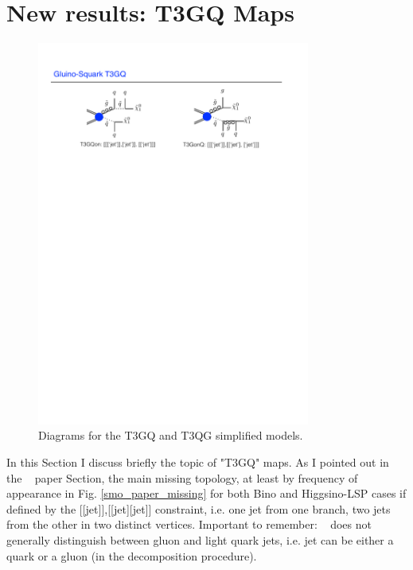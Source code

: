 \documentclass[a4paper,11pt]{article}
\begin{document}
\section{New results: T3GQ Maps}
\begin{figure}[!]
	\begin{center}
		\includegraphics[width=0.8\textwidth]{Fig/TGQ/TGQ.pdf}
	\end{center}
	\caption{Diagrams for the T3GQ and T3QG simplified models.}
	\label{tgq}
\end{figure}

In this Section I discuss briefly the topic of "T3GQ" maps. As I pointed out in the \SMO~ paper Section, the main missing topology, at least by frequency of appearance in Fig. \ref{smo_paper_missing} for both Bino and Higgsino-LSP cases if defined by the [[jet]],[[jet][jet]] constraint, i.e. one jet from one branch, two jets from the other in two distinct vertices. Important to remember: \SMO~ does not generally distinguish between gluon and light quark jets, i.e. jet can be either a quark or a gluon (in the decomposition procedure). 
\\
\end{document}
